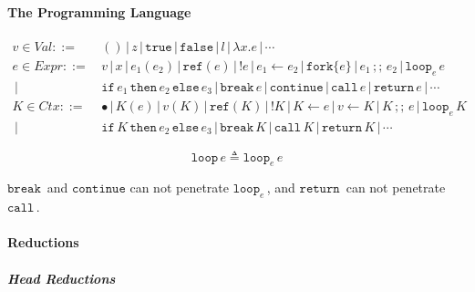 \documentclass{article}
\numberwithin{algorithm}{section}
\newcommand{\true}{\texttt{true}}
\newcommand{\false}{\texttt{false}}
\newcommand{\cref}{\texttt{ref}}
\newcommand{\cfork}[1]{\texttt{fork}\{#1\}}
\newcommand{\cloop}[1]{\texttt{loop}_{#1}\,}
\newcommand{\cbreak}{\texttt{break}\,}
\newcommand{\ccontinue}{\texttt{continue}}
\newcommand{\cif}{\texttt{if}\,}
\newcommand{\cthen}{\,\texttt{then}\,}
\newcommand{\celse}{\,\texttt{else}\,}
\newcommand{\cseq}{\,;;\,}
\newcommand{\creturn}{\texttt{return}\,}
\newcommand{\ccall}{\texttt{call}\,}
\newcommand{\sep}{\,|\,}
\begin{document}
\paragraph{The Programming Language}

$$
\begin{aligned}
    v \in \textit{Val} ::=\, & () \sep z \sep \true \sep \false \sep l \sep \lambda x.e \sep \cdots \\
    e \in \textit{Expr} ::=\, & v \sep x \sep e_1(e_2) \sep \cref(e) \sep !e \sep e_1 \leftarrow e_2 \sep \cfork{e} \sep e_1 \cseq e_2 \sep \cloop{e} e \\
                        \sep\, & \cif e_1 \cthen e_2 \celse e_3 \sep \cbreak e \sep \ccontinue \sep \ccall e \sep \creturn e \sep \cdots \\
    K \in \textit{Ctx} ::=\, & \bullet \sep K(e) \sep v(K) \sep \cref(K) \sep !K \sep K \leftarrow e \sep v \leftarrow K \sep K \cseq e \sep \cloop{e} K \\
                        \sep\, & \cif K \cthen e_2 \celse e_3 \sep \cbreak K \sep \ccall K \sep \creturn K \sep \cdots
\end{aligned}
$$

$$
\texttt{loop}\, e \triangleq \cloop{e} e
$$

$\cbreak\!$ and $\ccontinue$ can not penetrate $\cloop{e}\!$, and $\creturn\!$ can not penetrate $\ccall\!$.

\paragraph{Reductions}

\subparagraph{Head Reductions}
\end{document}
